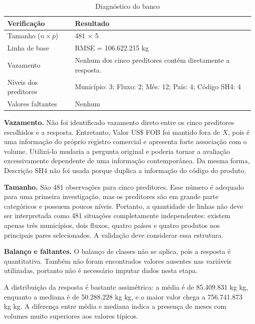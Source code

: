 \documentclass[
  article,12pt,oneside,a4paper,english,brazil
]{abntex2}
\begin{document}
\begin{table}[htb]
  \centering
  \caption{Diagnóstico do banco}
  \label{tab:diag}
  \small
  \begin{tabular}{@{}p{}p{}@{}}
    \toprule
    \textbf{Verificação} & \textbf{Resultado} \\
    \midrule
    Tamanho ($n \times p$) &
    481 $\times$ 5 \\
    Linha de base &
    RMSE = 106.622.215 kg \\
    Vazamento &
    Nenhum dos cinco preditores contém diretamente a resposta. \\
    Níveis dos preditores &
    Município: 3; Fluxo: 2; Mês: 12; País: 4; Código SH4: 4 \\
    Valores faltantes &
    Nenhum \\
    \bottomrule
  \end{tabular}
\end{table}

\textbf{Vazamento.} Não foi identificado vazamento direto entre os cinco
preditores escolhidos e a resposta. Entretanto, {Valor US\$ FOB} foi
mantido fora de $X$, pois é uma informação do próprio registro comercial e
apresenta forte associação com o volume. Utilizá-lo mudaria a pergunta
original e poderia tornar a avaliação excessivamente dependente de uma
informação contemporânea. Da mesma forma, {Descrição SH4} não foi
usada porque duplica a informação do código do produto.

\textbf{Tamanho.} São 481 observações para cinco preditores. Esse número é
adequado para uma primeira investigação, mas os preditores são em grande
parte categóricos e possuem poucos níveis. Portanto, a quantidade de linhas
não deve ser interpretada como 481 situações completamente independentes:
existem apenas três municípios, dois fluxos, quatro países e quatro produtos
nos principais pares selecionados. A validação deve considerar essa
estrutura.

\textbf{Balanço e faltantes.} O balanço de classes não se aplica, pois a
resposta é quantitativa. Também não foram encontrados valores ausentes nas
variáveis utilizadas, portanto não é necessário imputar dados nesta etapa.

A distribuição da resposta é bastante assimétrica: a média é de
85.409.831 kg
kg, enquanto a mediana é de
50.288.228 kg
kg, e o maior valor chega a
756.741.873 kg
kg. A diferença entre média e mediana indica a presença de meses com volumes
muito superiores aos valores típicos.
\end{document}
